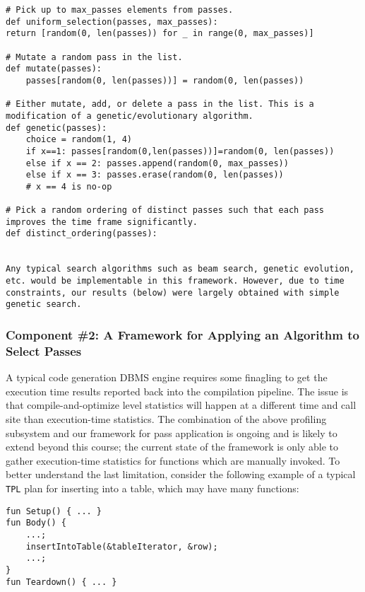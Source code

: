 \documentclass{vldb}
\newcommand{\tpl}{\texttt{TPL}\xspace}
\begin{document}
\begin{lstlisting}
# Pick up to max_passes elements from passes.
def uniform_selection(passes, max_passes):
return [random(0, len(passes)) for _ in range(0, max_passes)]

# Mutate a random pass in the list.
def mutate(passes):
    passes[random(0, len(passes))] = random(0, len(passes))

# Either mutate, add, or delete a pass in the list. This is a modification of a genetic/evolutionary algorithm.
def genetic(passes):
    choice = random(1, 4)
    if x==1: passes[random(0,len(passes))]=random(0, len(passes))
    else if x == 2: passes.append(random(0, max_passes))
    else if x == 3: passes.erase(random(0, len(passes))
    # x == 4 is no-op
    
# Pick a random ordering of distinct passes such that each pass improves the time frame significantly.
def distinct_ordering(passes):


Any typical search algorithms such as beam search, genetic evolution, etc. would be implementable in this framework. However, due to time constraints, our results (below) were largely obtained with simple genetic search.
\end{lstlisting}

\subsubsection{Component \#2: A Framework for Applying an Algorithm to Select Passes}

A typical code generation DBMS engine requires some finagling to get the execution time results reported back into the compilation pipeline. The issue is that compile-and-optimize level statistics will happen at a different time and call site than execution-time statistics. The combination of the above profiling subsystem and our framework for pass application is ongoing and is likely to extend beyond this course; the current state of the framework is only able to gather execution-time statistics for functions which are manually invoked. To better understand the last limitation, consider the following example of a typical \tpl plan for inserting into a table, which may have many functions:

\begin{lstlisting}
fun Setup() { ... }
fun Body() { 
    ...;
    insertIntoTable(&tableIterator, &row);
    ...;
}
fun Teardown() { ... }
\end{lstlisting}
\end{document}
